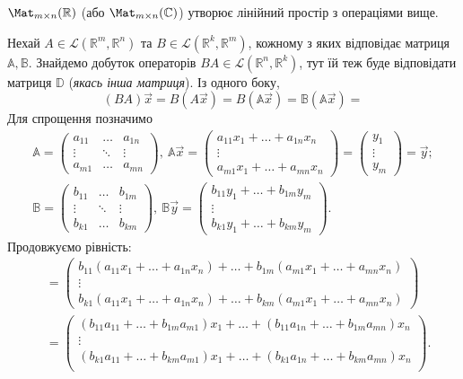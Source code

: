\documentclass{math_library}
\begin{document}
	\begin{proposition}
	$\Mat_{m \times n}(\mathbb{R})$ (або $\Mat_{m \times n}(\mathbb{C})$) утворює лінійний простір з операціями вище.
	\end{proposition}
	
	\noindent
	Нехай $A \in \mathcal{L}(\mathbb{R}^m,\mathbb{R}^n)$ та $B \in \mathcal{L}(\mathbb{R}^k,\mathbb{R}^m)$, кожному з яких відповідає матриця $\mathbb{A},\mathbb{B}$. Знайдемо добуток операторів $BA \in \mathcal{L}(\mathbb{R}^n,\mathbb{R}^k)$, тут їй теж буде відповідати матриця $\mathbb{D}$ (\textit{якась інша матриця}). Із одного боку,
	\[
	(BA)\vec{x} = B(A\vec{x}) = B(\mathbb{A}\vec{x}) = \mathbb{B}(\mathbb{A}\vec{x}) \boxed{=}
	\]
	Для спрощення позначимо
	\begin{align*}
	\mathbb{A} = \begin{pmatrix}
	a_{11} & \dots & a_{1n}\\
	\vdots & \ddots & \vdots \\
	a_{m1} & \dots & a_{mn}
	\end{pmatrix},\
	\mathbb{A}\vec{x} = \begin{pmatrix}
	a_{11}x_1 + \dots + a_{1n}x_n \\
	\vdots \\
	a_{m1}x_1 + \dots + a_{mn}x_n
	\end{pmatrix} = \begin{pmatrix}
	y_1\\
	\vdots \\
	y_m
	\end{pmatrix} = \vec{y}; \\	
	\mathbb{B} = \begin{pmatrix}
	b_{11} & \dots & b_{1m}\\
	\vdots & \ddots & \vdots \\
	b_{k1} & \dots & b_{km}
	\end{pmatrix},\ \mathbb{B}\vec{y} = \begin{pmatrix}
	b_{11}y_1 + \dots + b_{1m}y_m \\
	\vdots \\
	b_{k1}y_1 + \dots + b_{km}y_m
	\end{pmatrix}.
	\end{align*}
	Продовжуємо рівність:
	\begin{align*}
	& \boxed{=} \begin{pmatrix}
	b_{11}(a_{11}x_1 + \dots + a_{1n}x_n) + \dots + b_{1m}(a_{m1}x_1 + \dots + a_{mn}x_n) \\
	\vdots \\
	b_{k1}(a_{11}x_1 + \dots + a_{1n}x_n) + \dots + b_{km}(a_{m1}x_1 + \dots + a_{mn}x_n)
	\end{pmatrix} \\
	& = \begin{pmatrix}
	(b_{11}a_{11} + \dots + b_{1m}a_{m1})x_1 + \dots + (b_{11}a_{1n} + \dots + b_{1m}a_{mn})x_n \\
	\vdots \\
	(b_{k1}a_{11} + \dots + b_{km}a_{m1})x_1 + \dots + (b_{k1}a_{1n} + \dots + b_{km}a_{mn})x_n \\
	\end{pmatrix}.
	\end{align*}
\end{document}
